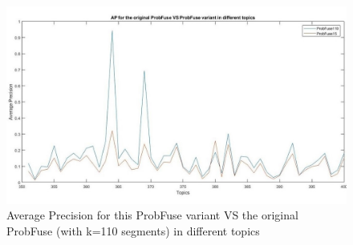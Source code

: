 \documentclass[12pt,journal]{IEEEtran}
\begin{document}
\begin{figure}
\includegraphics[scale=0.33]{plot3}
\caption{Average Precision for this ProbFuse variant VS the original ProbFuse (with k=110 segments) in different topics}
\label{Average Precision for this ProbFuse variant VS the original ProbFuse (with k=110 segments) in different topics}
\end{figure}
\end{document}
